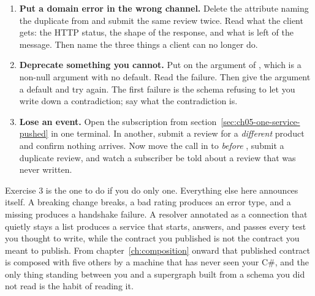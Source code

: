 \begin{enumerate}
  \item \textbf{Put a domain error in the wrong channel.} Delete the
  \code{[Error]} attribute naming the duplicate from
   and submit
  the same review twice. Read what the client gets: the HTTP status, the shape
  of the response, and what is left of the message. Then name the three things a
  client can no longer do.

  \item \textbf{Deprecate something you cannot.} Put \code{[GraphQLDeprecated]}
  on the  argument of , which is a non-null
  argument with no default. Read the failure. Then give the argument a default
  and try again. The first failure is the schema refusing to let you write down
  a contradiction; say what the contradiction is.

  \item \textbf{Lose an event.} Open the subscription from
  section~\ref{sec:ch05-one-service-pushed} in one terminal. In another, submit
  a review for a \emph{different} product and confirm nothing arrives. Now move
  the  call in  to \emph{before}
  , submit a duplicate review, and watch a subscriber be
  told about a review that was never written.
\end{enumerate}

Exercise 3 is the one to do if you do only one. Everything else here announces
itself. A breaking change breaks, a bad rating produces an error type, and a
missing  produces a handshake failure. A resolver annotated
as a connection that quietly stays a list produces a service that starts,
answers, and passes every test you thought to write, while the contract you
published is not the contract you meant to publish. From
chapter~\ref{ch:composition} onward that published contract is composed with
five others by a machine that has never seen your C\#, and the only thing
standing between you and a supergraph built from a schema you did not read is
the habit of reading it.
